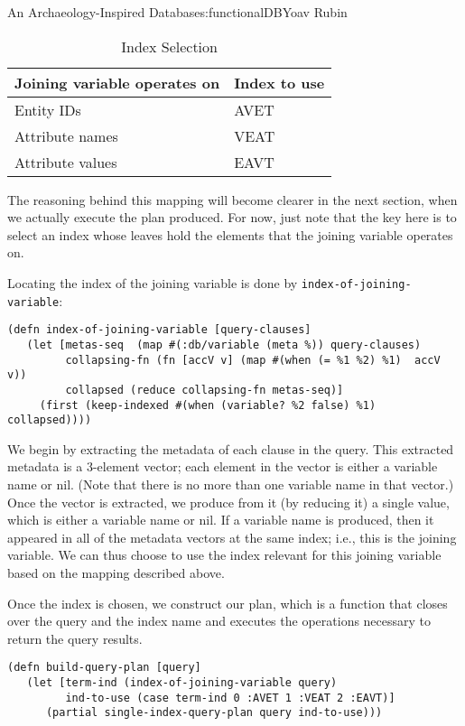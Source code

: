 \begin{aosachapter}{An Archaeology-Inspired Database}{s:functionalDB}{Yoav Rubin}
\begin{table}
\centering
{\footnotesize
{}
\begin{tabular}{ll}
\hline
\textbf{Joining variable operates on} & \textbf{Index to use} \\
\hline
Entity IDs & AVET \\
Attribute names & VEAT \\
Attribute values & EAVT \\
\hline
\end{tabular}
}
\caption{Index Selection}
\label{500l.functionaldb.indexselection}
\end{table}

The reasoning behind this mapping will become clearer in the next
section, when we actually execute the plan produced. For now, just note
that the key here is to select an index whose leaves hold the elements
that the joining variable operates on.

Locating the index of the joining variable is done by
\texttt{index-of-joining-variable}:

\begin{verbatim}
(defn index-of-joining-variable [query-clauses]
   (let [metas-seq  (map #(:db/variable (meta %)) query-clauses) 
         collapsing-fn (fn [accV v] (map #(when (= %1 %2) %1)  accV v))
         collapsed (reduce collapsing-fn metas-seq)] 
     (first (keep-indexed #(when (variable? %2 false) %1)  collapsed)))) 
\end{verbatim}

We begin by extracting the metadata of each clause in the query. This
extracted metadata is a 3-element vector; each element in the vector is
either a variable name or nil. (Note that there is no more than one
variable name in that vector.) Once the vector is extracted, we produce
from it (by reducing it) a single value, which is either a variable name
or nil. If a variable name is produced, then it appeared in all of the
metadata vectors at the same index; i.e., this is the joining variable.
We can thus choose to use the index relevant for this joining variable
based on the mapping described above.

Once the index is chosen, we construct our plan, which is a function
that closes over the query and the index name and executes the
operations necessary to return the query results.

\begin{verbatim}
(defn build-query-plan [query]
   (let [term-ind (index-of-joining-variable query)
         ind-to-use (case term-ind 0 :AVET 1 :VEAT 2 :EAVT)]
      (partial single-index-query-plan query ind-to-use)))
\end{verbatim}


\end{aosachapter}
